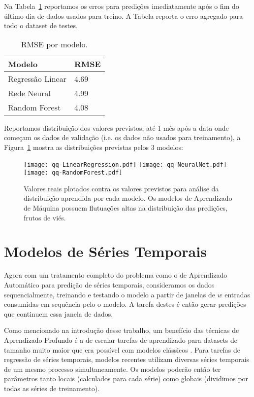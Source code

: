 Na Tabela~\ref{tb:rmse_lin} reportamos os erros para predições imediatamente
após o fim do último dia de dados usados para treino. A Tabela reporta o erro agregado
para todo o dataset de testes.

\begin{center}
\begin{table}[htbp]
\caption{RMSE por modelo.}
\centering
\begin{tabular}{|l|l|}
    \hline
    Modelo           & RMSE \\ \hline
    Regressão Linear & 4.69 \\ \hline
    Rede Neural      & 4.99 \\ \hline
    Random Forest    & 4.08 \\ \hline
  \end{tabular}
\label{tb:rmse_lin}
\end{table}
\end{center}

 Reportamos distribuição dos valores previstos, até 1 mês após a data
onde começam os dados de validação (i.e. os dados não usados para treinamento),
a Figura~\ref{fig:distr_lin} mostra as distribuições previstas pelos 3 modelos:

\begin{figure}[H]
\centering
\texttt{[image: qq-LinearRegression.pdf]} \hfill
\texttt{[image: qq-NeuralNet.pdf]} \hfill
\texttt{[image: qq-RandomForest.pdf]} 
\caption{Valores reais plotados contra os valores previstos para análise da
  distribuição aprendida por cada modelo. Os modelos de Aprendizado de Máquina
  possuem flutuações altas na distribuição das predições, frutos de viés.} 
\label{fig:distr_lin}
\end{figure}


\section{Modelos de Séries Temporais}


Agora com um tratamento completo do problema como o de Aprendizado Automático para predição de séries
temporais, consideramos os dados sequencialmente, treinando e testando o modelo a partir de janelas de $w$
entradas consumidas em sequência pelo o modelo. A tarefa destes é então gerar
predições que continuem essa janela de dados. 

Como mencionado na introdução desse trabalho, um benefício das técnicas de
Aprendizado Profundo é a de escalar tarefas de aprendizado para datasets de
tamanho muito maior que era possível com modelos clássicos \citep{dlbook}.
Para tarefas de regressão de séries temporais, modelos recentes utilizam
diversas séries temporais de um mesmo processo simultaneamente.
Os modelos poderão então ter parâmetros tanto locais (calculados
para cada série) como globais (dividimos por todas as séries de treinamento).

